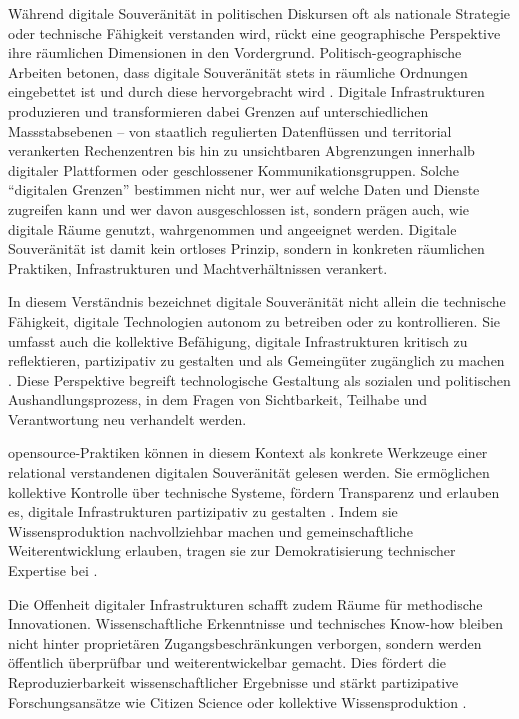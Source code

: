 Während digitale Souveränität in politischen Diskursen oft als nationale Strategie oder technische Fähigkeit verstanden wird, rückt eine geographische Perspektive ihre räumlichen Dimensionen in den Vordergrund. Politisch-geographische Arbeiten betonen, dass digitale Souveränität stets in räumliche Ordnungen eingebettet ist und durch diese hervorgebracht wird \parencite{glaszeContestedSpatialitiesDigital2023,zhangBordersBorderingSovereignty2023}. Digitale Infrastrukturen produzieren und transformieren dabei Grenzen auf unterschiedlichen Massstabsebenen -- von staatlich regulierten Datenflüssen und territorial verankerten Rechenzentren bis hin zu unsichtbaren Abgrenzungen innerhalb digitaler Plattformen oder geschlossener Kommunikationsgruppen. Solche \enquote{digitalen Grenzen} bestimmen nicht nur, wer auf welche Daten und Dienste zugreifen kann und wer davon ausgeschlossen ist, sondern prägen auch, wie digitale Räume genutzt, wahrgenommen und angeeignet werden. Digitale Souveränität ist damit kein ortloses Prinzip, sondern in konkreten räumlichen Praktiken, Infrastrukturen und Machtverhältnissen verankert.

In diesem Verständnis bezeichnet digitale Souveränität nicht allein die technische Fähigkeit, digitale Technologien autonom zu betreiben oder zu kontrollieren. Sie umfasst auch die kollektive Befähigung, digitale Infrastrukturen kritisch zu reflektieren, partizipativ zu gestalten und als Gemeingüter zugänglich zu machen \parencite{baackDataficationEmpowermentHow2015,glaszeContestedSpatialitiesDigital2023}. Diese Perspektive begreift technologische Gestaltung als sozialen und politischen Aushandlungsprozess, in dem Fragen von Sichtbarkeit, Teilhabe und Verantwortung neu verhandelt werden.

\gls{opensource}-Praktiken können in diesem Kontext als konkrete Werkzeuge einer relational verstandenen digitalen Souveränität gelesen werden. Sie ermöglichen kollektive Kontrolle über technische Systeme, fördern Transparenz und erlauben es, digitale Infrastrukturen partizipativ zu gestalten \parencite{gurumurthyDataBodiesNew2022}. Indem sie Wissensproduktion nachvollziehbar machen und gemeinschaftliche Weiterentwicklung erlauben, tragen sie zur Demokratisierung technischer Expertise bei \parencite{baackDataficationEmpowermentHow2015, pohleDigitalSovereignty2020}.

Die Offenheit digitaler Infrastrukturen schafft zudem Räume für methodische Innovationen. Wissenschaftliche Erkenntnisse und technisches Know-how bleiben nicht hinter proprietären Zugangsbeschränkungen verborgen, sondern werden öffentlich überprüfbar und weiterentwickelbar gemacht. Dies fördert die Reproduzierbarkeit wissenschaftlicher Ergebnisse und stärkt partizipative Forschungsansätze wie Citizen Science oder kollektive Wissensproduktion \parencite{fecherWhatDrivesAcademic2014}.

